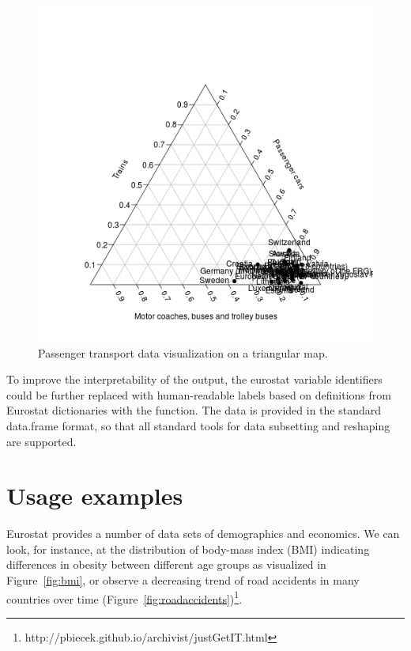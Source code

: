 \begin{figure}
\begin{center}
\includegraphics{2015-manu-search2-1}
\end{center}
\caption{Passenger transport data visualization on a triangular map.}
\label{fig:plotrix}
\end{figure}


To improve the interpretability of the output, the eurostat variable
identifiers could be further replaced with human-readable labels based
on definitions from Eurostat dictionaries with
the  function. The data is provided in the
standard data.frame format, so that all standard tools for data
subsetting and reshaping are supported.


\section{Usage examples}

Eurostat provides a number of data sets of demographics and
economics. We can look, for instance, at the distribution of body-mass
index (BMI) indicating differences in obesity between different age
groups as visualized in Figure~\ref{fig:bmi}, or observe a decreasing
trend of road accidents in many countries over time
(Figure~\ref{fig:roadaccidents})\footnote{http://pbiecek.github.io/archivist/justGetIT.html}.


